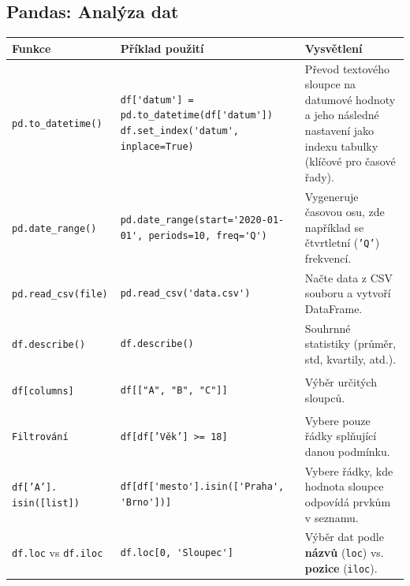 \documentclass[a4paper, 11pt]{article}
\newenvironment{funkcedict}
{%
  \begingroup
  \renewcommand{\arraystretch}{1.4}%
  \lstset{basicstyle=\ttfamily\small, columns=fullflexible}%
  \setlength{\tabcolsep}{4pt}%
  \begin{tabular}{p{0.19\textwidth} p{0.38\textwidth} p{0.30\textwidth}}
  \textbf{Funkce} & \textbf{Příklad použití} & \textbf{Vysvětlení} \\
  \midrule
}
{%
  \end{tabular}%
  \endgroup
}
\begin{document}
			\subsection{Pandas: Analýza dat}
			\begin{funkcedict}
				\texttt{pd.to\_datetime()} &
				\begin{lstlisting}
df['datum'] = pd.to_datetime(df['datum'])
df.set_index('datum', inplace=True)
				\end{lstlisting}
				& Převod textového sloupce na datumové hodnoty a jeho následné nastavení jako indexu tabulky (klíčové pro časové řady). \\

				\texttt{pd.date\_range()} &
				\begin{lstlisting}
pd.date_range(start='2020-01-01', periods=10, freq='Q')
				\end{lstlisting}
				& Vygeneruje časovou osu, zde například se čtvrtletní (\texttt{'Q'}) frekvencí. \\
				\texttt{pd.read\_csv(file)} &
				\begin{lstlisting}
pd.read_csv('data.csv')
				\end{lstlisting}
				& Načte data z CSV souboru a vytvoří DataFrame. \\
				\texttt{df.describe()} &
				\begin{lstlisting}
df.describe()
				\end{lstlisting}
				& Souhrnné statistiky (průměr, std, kvartily, atd.). \\
				\texttt{df[columns]} &
				\begin{lstlisting}
df[["A", "B", "C"]]
				\end{lstlisting}
				& Výběr určitých sloupců. \\
				\texttt{Filtrování} & \texttt{df[df['Věk'] >= 18]} & Vybere pouze řádky splňující danou podmínku. \\
				\texttt{df['A']. isin([list])} &
				\begin{lstlisting}
df[df['mesto'].isin(['Praha', 'Brno'])]
				\end{lstlisting}
				& Vybere řádky, kde hodnota sloupce odpovídá prvkům v seznamu. \\
				\texttt{df.loc} vs \texttt{df.iloc} &
				\begin{lstlisting}
df.loc[0, 'Sloupec']
				\end{lstlisting}
				& Výběr dat podle \textbf{názvů} (\texttt{loc}) vs. \textbf{pozice} (\texttt{iloc}). \\
			\end{funkcedict}
\end{document}
